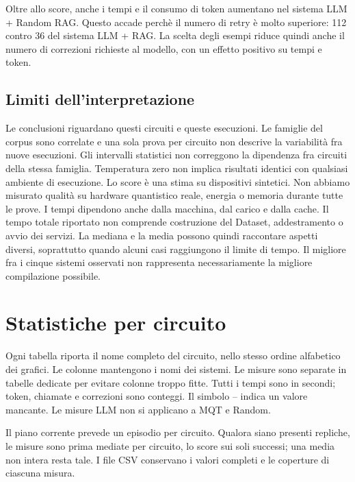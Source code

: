 Oltre allo score, anche i tempi e il consumo di token aumentano nel sistema LLM + Random RAG. Questo accade perchè il numero di retry è molto superiore: 112 contro 36 del sistema LLM + RAG. La scelta degli esempi riduce quindi anche il numero di correzioni richieste al modello, con un effetto positivo su tempi e token.

\clearpage\subsection{Limiti dell'interpretazione}
Le conclusioni riguardano questi circuiti e queste esecuzioni. Le famiglie del corpus sono correlate
e una sola prova per circuito non descrive la variabilità fra nuove esecuzioni. Gli intervalli statistici
non correggono la dipendenza fra circuiti della stessa famiglia. Temperatura zero non implica risultati
identici con qualsiasi ambiente di esecuzione.
Lo score è una stima su dispositivi sintetici. Non abbiamo misurato qualità su hardware quantistico
reale, energia o memoria durante tutte le prove. I tempi dipendono anche dalla macchina, dal carico e
dalla cache. Il tempo totale riportato non comprende costruzione del Dataset, addestramento o avvio
dei servizi. La mediana e la media possono quindi raccontare aspetti diversi, soprattutto quando
alcuni casi raggiungono il limite di tempo.
Il migliore fra i cinque sistemi osservati non rappresenta
necessariamente la migliore compilazione possibile.

\clearpage\appendix\section{Statistiche per circuito}
Ogni tabella riporta il nome completo del circuito, nello stesso ordine alfabetico dei grafici. Le colonne mantengono i nomi dei sistemi. Le misure sono separate in tabelle dedicate per evitare colonne troppo fitte. Tutti i tempi sono in secondi; token, chiamate e correzioni sono conteggi. Il simbolo -- indica un valore mancante. Le misure LLM non si applicano a MQT e Random.

Il piano corrente prevede un episodio per circuito. Qualora siano presenti repliche, le misure sono prima mediate per circuito, lo score sui soli successi; una media non intera resta tale. I file CSV conservano i valori completi e le coperture di ciascuna misura.
